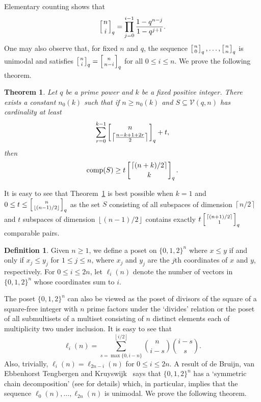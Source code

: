 \documentclass[11 pt]{article}
\newtheorem{thm}[equation]{Theorem}
\theoremstyle{definition}
\newtheorem{defn}[equation]{Definition}
\theoremstyle{case}
\numberwithin{equation}{section}
\DeclareMathOperator{\comp}{comp}
\newcommand{\qbinom}[3]{\left[\genfrac{}{}{0pt}{}{#1}{#2}\right]_{#3}}
\newcommand{\Vectors}[2]{\mathcal{V}\left(#1,#2\right)}
\begin{document}
Elementary counting shows that 
\[\qbinom{n}{i}{q}=\prod_{j=0}^{i-1}\frac{1-q^{n-j}}{1-q^{j+1}}.\]
One may also observe that, for fixed $n$ and $q$, the sequence $\qbinom{n}{0}{q},\dots,\qbinom{n}{n}{q}$ is unimodal and satisfies $\qbinom{n}{i}{q} = \qbinom{n}{n-i}{q}$ for all $0\leq i\leq n$. We prove the following theorem.




\begin{thm}
\label{vecSpThm}
Let $q$ be a prime power and $k$ be a fixed positive integer. There exists a constant $n_0(k)$ such that if $n\geq n_0(k)$ and $S\subseteq \Vectors{q}{n}$ has cardinality at least 
\[\sum_{r=0}^{k-1}\qbinom{n}{\left\lceil\frac{n-k+1+2r}{2}\right\rceil}{q}+t,\] then
\[\comp(S)\geq t\qbinom{\left\lceil (n+k)/2\right\rceil}{k}{q}.\]
\end{thm}

It is easy to see that Theorem~\ref{vecSpThm} is best possible when $k=1$ and $0\leq t \leq \qbinom{n}{\left\lfloor (n-1)/2\right\rfloor}{q}$ as the set $S$ consisting of all subspaces of dimension $\left\lceil n/2\right\rceil$ and $t$ subspaces of dimension $\left\lfloor (n-1)/2\right\rfloor$ contains exactly $ t\qbinom{\left\lceil (n+1)/2\right\rceil}{1}{q}$ comparable pairs. 

\begin{defn}
Given $n\geq 1$, we define a poset on $\{0,1,2\}^n$ where $x\leq y$ if and only if $x_j\leq y_j$ for $1\leq j\leq n$, where $x_j$ and $y_j$ are the $j$th coordinates of $x$ and $y$, respectively. 
For $0\leq i\leq 2n$, let $\ell_i(n)$ denote the number of vectors in $\{0,1,2\}^n$ whose coordinates sum to $i$.
\end{defn}


The poset $\{0,1,2\}^n$ can also be viewed as the poset of divisors of the square of a square-free integer with $n$ prime factors under the `divides' relation or the poset of all submultisets of a multiset consisting of $n$ distinct elements each of multiplicity two under inclusion. It is easy to see that
\[\ell_i(n) = \sum_{s=\max\{0,i-n\}}^{\left\lfloor i/2\right\rfloor}\binom{n}{i-s}\binom{i-s}{s}.\] Also, trivially, $\ell_i(n)=\ell_{2n-i}(n)$ for $0\leq i\leq 2n$. A result of de Bruijn, van Ebbenhorst Tengbergen and Kruyswijk~\cite{multiSperner} says that $\{0,1,2\}^n$ has a `symmetric chain decomposition' (see \cite{AndersonBook} for details) which, in particular, implies that the sequence $\ell_0(n),\dots,\ell_{2n}(n)$ is unimodal. We prove the following theorem.
\end{document}

